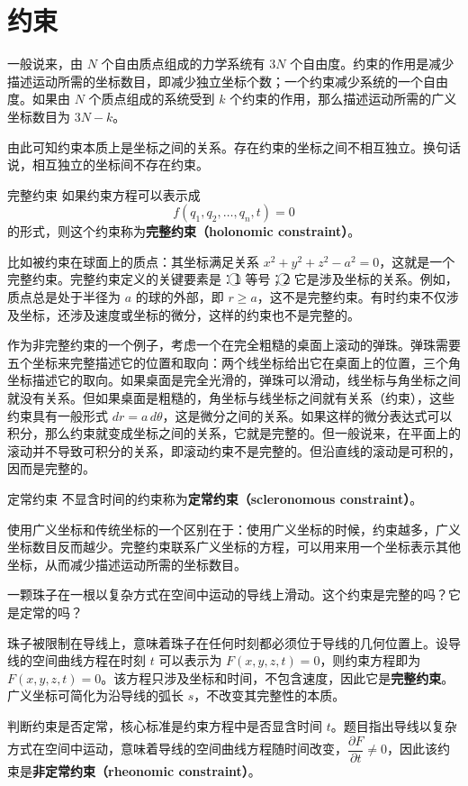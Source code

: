 \section{约束}

一般说来，由 $N$ 个自由质点组成的力学系统有 $3N$ 个自由度。约束的作用是减少描述运动所需的坐标数目，即减少独立坐标个数；一个约束减少系统的一个自由度。如果由 $N$ 个质点组成的系统受到 $k$ 个约束的作用，那么描述运动所需的广义坐标数目为 $3N - k$。

由此可知约束本质上是坐标之间的关系。存在约束的坐标之间不相互独立。换句话说，相互独立的坐标间不存在约束。

\begin{mydefinition}{完整约束}
如果约束方程可以表示成
$$f(q_1, q_2, \ldots, q_n, t) = 0$$
的形式，则这个约束称为\textbf{完整约束（holonomic constraint）}。
\end{mydefinition}

比如被约束在球面上的质点：其坐标满足关系 $x^2 + y^2 + z^2 - a^2 = 0$，这就是一个完整约束。完整约束定义的关键要素是：\textcircled{1} 等号；\textcircled{2} 它是涉及坐标的关系。例如，质点总是处于半径为 $a$ 的球的外部，即 $r \geq a$，这不是完整约束。有时约束不仅涉及坐标，还涉及速度或坐标的微分，这样的约束也不是完整的。

作为非完整约束的一个例子，考虑一个在完全粗糙的桌面上滚动的弹珠。弹珠需要五个坐标来完整描述它的位置和取向：两个线坐标给出它在桌面上的位置，三个角坐标描述它的取向。如果桌面是完全光滑的，弹珠可以滑动，线坐标与角坐标之间就没有关系。但如果桌面是粗糙的，角坐标与线坐标之间就有关系（约束），这些约束具有一般形式 $dr = a\,d\theta$，这是微分之间的关系。如果这样的微分表达式可以积分，那么约束就变成坐标之间的关系，它就是完整的。但一般说来，在平面上的滚动并不导致可积分的关系，即滚动约束不是完整的。但沿直线的滚动是可积的，因而是完整的。

\begin{mydefinition}{定常约束}
不显含时间的约束称为\textbf{定常约束（scleronomous constraint）}。
\end{mydefinition}

使用广义坐标和传统坐标的一个区别在于：使用广义坐标的时候，约束越多，广义坐标数目反而越少。完整约束联系广义坐标的方程，可以用来用一个坐标表示其他坐标，从而减少描述运动所需的坐标数目。

\begin{example}[珠子在运动导线上滑动]
一颗珠子在一根以复杂方式在空间中运动的导线上滑动。这个约束是完整的吗？它是定常的吗？
\end{example}

\begin{solution}
珠子被限制在导线上，意味着珠子在任何时刻都必须位于导线的几何位置上。设导线的空间曲线方程在时刻 $t$ 可以表示为 $F(x, y, z, t) = 0$，则约束方程即为 $F(x, y, z, t) = 0$。该方程只涉及坐标和时间，不包含速度，因此它是\textbf{完整约束}。广义坐标可简化为沿导线的弧长 $s$，不改变其完整性的本质。

判断约束是否定常，核心标准是约束方程中是否显含时间 $t$。题目指出导线以复杂方式在空间中运动，意味着导线的空间曲线方程随时间改变，$\dfrac{\partial F}{\partial t}\neq 0$，因此该约束是\textbf{非定常约束（rheonomic constraint）}。
\end{solution}


